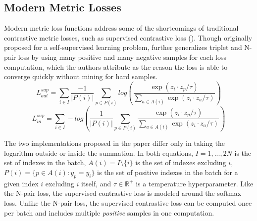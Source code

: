 \documentclass[./dissertation.tex]{subfiles}
\begin{document}
    \subsection{Modern Metric Losses}
    Modern metric loss functions address some of the shortcomings of traditional contrastive metric losses, such as supervised contrastive loss (\cite{khosla2020supervised}). Though originally proposed for a self-supervised learning problem, further generalizes triplet and N-pair loss by using many positive and many negative samples for each loss computation, which the authors attribute as the reason the loss is able to converge quickly without mining for hard samples. \\ 
    
    \begin{equation*}
    L_{out}^{sup} = \sum_{i \in I} \frac{-1}{|P(i)|}
    \sum_{p \in P(i)}log(\frac{\exp(z_{i} \cdot z_{p} / \tau)}
    {\sum_{a \in A(i)}\exp(z_{i} \cdot z_{a} / \tau)}) 
    \end{equation*} 
    \begin{equation*}
    L_{in}^{sup} = \sum_{i \in I} -log(\frac{1}{|P(i)|}\sum_{p \in P(i)}
    \frac{\exp(z_{i} \cdot z_{p} / \tau)}
    {\sum_{a \in A(i)}\exp(z_{i} \cdot z_{a} / \tau)}) 
    \end{equation*}
    
    The two implementations proposed in the paper differ only in taking the logarithm outside or inside the summation. In both equations, $I = {1, ..., 2N}$ is the set of indexes in the batch, $A(i) = I \setminus \{i\}$ is the set of indexes excluding $i$, $P(i) = \{p \in A(i) : y_{p} = y _{i}\}$ is the set of positive indexes in the batch for a given index $i$ excluding $i$ itself, and $\tau \in \mathbb{R}^{+}$ is a temperature hyperparameter. Like the N-pair loss, the supervised contrastive loss is modeled around the softmax loss. Unlike the N-pair loss, the supervised contrastive loss can be computed once per batch and includes multiple \textit{positive} samples in one computation. \\
    
\end{document}
